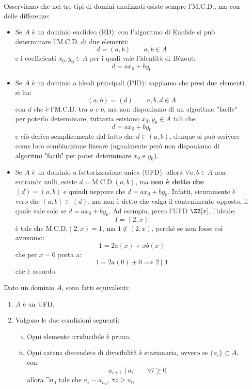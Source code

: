 \documentclass[11pt]{scrartcl}
\begin{document}
\begin{remark}
    Osserviamo che nei tre tipi di domini analizzati esiste sempre l'M.C.D., ma con delle differenze:
    \begin{itemize}
        \item Se $A$ è un dominio euclideo (ED): con l'algoritmo di Euclide si può determinare l'M.C.D. di due elementi:
        \[ d = (a,b) \qquad a,b \in A
            \]
        e i coefficienti $x_0,y_0 \in A$ per i quali vale l'identità di Bézout:
        \[ d = ax_0 + by_0
            \]
        \item Se $A$ è un dominio a ideali principali (PID): sappiamo che presi due elementi si ha:
        \[ (a,b) = (d) \qquad a,b,d \in A
            \]
        con $d$ che è l'M.C.D. tra $a$ e $b$, ma non disponiamo di un algoritmo "facile" per poterlo determinare, tuttavia esistono $x_0, y_0 \in A$ tali che:
        \[ d = ax_0 + by_0
            \]
        e ciò deriva semplicemente dal fatto che $d \in (a,b)$, dunque si può scrivere come loro combinazione lineare (ugualmente però non disponiamo di algoritmi "facili" per poter determinare $x_0$ e $y_0$).
        \item Se $A$ è un dominio a fattorizzazione unica (UFD): allora $\forall a,b \in A$ non entrambi nulli, esiste $d = \text{M.C.D.}(a,b)$, ma \textbf{non è detto che} $(d) = (a,b)$ e quindi neppure che $d = ax_0 + by_0$.
        Infatti, sicuramente è vero che $(a,b) \subset (d)$, ma non è detto che valga il contenimento opposto, il quale vale solo se $d = ax_0 + by_0$. Ad esempio, preso l'UFD $\ZZ[x]$, l'ideale:
        \[ I = (2,x)
            \]
        è tale che $\text{M.C.D.}(2,x) = 1$, ma $1 \not \in (2,x)$, perché se non fosse coì avremmo:
        \[ 1 = 2a(x) + xb(x)
            \]
        che per $x = 0$ porta a:
        \[ 1 = 2a(0) + 0 \implies 2 \mid 1
            \]
        che è assurdo.
    \end{itemize}
\end{remark}

\begin{theorem}
    \label{2.101}
    Dato un dominio $A$, sono fatti equivalenti:
    \begin{enumerate}[(1)]
        \item $A$ è un UFD.
        \item Valgono le due condizioni seguenti:
        \begin{enumerate}[(i)]
            \item Ogni elemento irriducibile è primo.
            \item Ogni catena discendete di divisibilità è stazionaria, ovvero se $\{a_i\} \subset A$, con:
            \[ a_{i+1} \mid a_i \qquad \forall i \geq 0
                \]
            allora $\exists n_0$ tale che $a_i \sim a_{n_0}$, $\forall i \geq n_0$.
        \end{enumerate}
    \end{enumerate}
\end{theorem}
\end{document}
